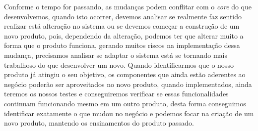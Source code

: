       Conforme o tempo for passando, as mudanças podem conflitar com o \textit{core}
      do que desenvolvemos, quando isto ocorrer, devemos analisar se realmente faz
      sentido realizar está alteração no sistema ou se devemos começar a construção
      de um novo produto, pois, dependendo da alteração, podemos ter que alterar muito
      a forma que o produto funciona, gerando muitos riscos na implementação dessa
      mudança, precisamos analisar se adaptar o sistema está se tornando mais trabalhoso
      do que desenvolver um novo. Quando identificarmos que o nosso produto já
      atingiu o seu objetivo, os componentes que ainda estão aderentes ao negócio
      poderão ser aproveitados no novo produto, quando implementados, ainda teremos
      os nossos testes e conseguiremos verificar se essas funcionalidades continuam
      funcionando mesmo em um outro produto, desta forma conseguimos identificar
      exatamente o que mudou no negócio e podemos focar na criação de um novo
      produto, mantendo os ensinamentos do produto passado.


